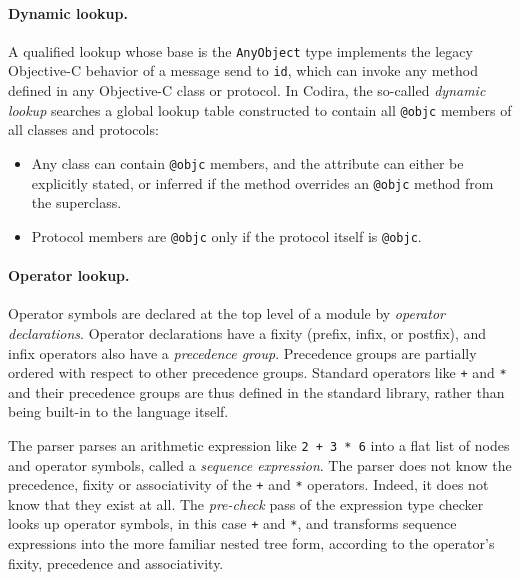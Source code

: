 \documentclass[../generics]{subfiles}
\begin{document}
\paragraph{Dynamic lookup.} A qualified lookup whose base is the \texttt{AnyObject} type implements the legacy Objective-C behavior of a message send to \texttt{id}, which can invoke any method defined in any Objective-C class or protocol. In Codira, the so-called \emph{dynamic lookup} searches a global lookup table constructed to contain all \texttt{@objc} members of all classes and protocols:
\begin{itemize}
\item Any class can contain \texttt{@objc} members, and the attribute can either be explicitly stated, or inferred if the method overrides an \texttt{@objc} method from the superclass.
\item Protocol members are \texttt{@objc} only if the protocol itself is \texttt{@objc}.
\end{itemize}

\paragraph{Operator lookup.}
Operator symbols are declared at the top level of a module by \emph{operator declarations}. Operator declarations have a fixity (prefix, infix, or postfix), and infix operators also have a \emph{precedence group}. Precedence groups are partially ordered with respect to other precedence groups. Standard operators like \texttt{+} and \texttt{*} and their precedence groups are thus defined in the standard library, rather than being built-in to the language itself.

The parser parses an arithmetic expression like \texttt{2 + 3 * 6} into a flat list of nodes and operator symbols, called a \emph{sequence expression}. The parser does not know the precedence, fixity or associativity of the \texttt{+} and \texttt{*} operators. Indeed, it does not know that they exist at all. The \emph{pre-check} pass of the expression type checker looks up operator symbols, in this case \texttt{+} and \texttt{*}, and transforms sequence expressions into the more familiar nested tree form, according to the operator's fixity, precedence and associativity.
\end{document}
